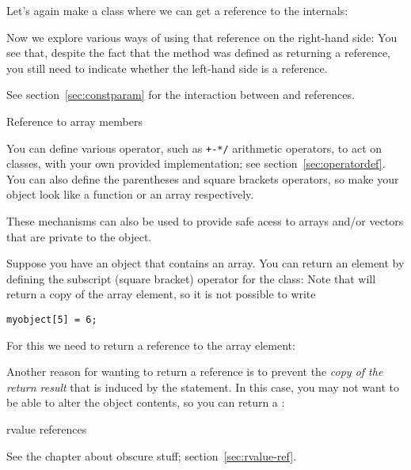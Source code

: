 Let's again make a class where we can get a reference to the
internals:
%

Now we explore various ways of using that reference on the right-hand
side:
%
%
You see that, despite the fact that the method  was defined as
returning a reference, you still need to indicate whether the
left-hand side is a reference.

See section~\ref{sec:constparam} for the interaction between 
and references.

 {Reference to array members}
\label{sec:overloadbracket}

You can define various operator, such as \verb.+-*/. arithmetic
operators, to act on classes, with your own provided implementation;
see section~\ref{sec:operatordef}. You can also define the parentheses
and square brackets operators, so make your object look like a
function or an array respectively.

These mechanisms can also be used to provide safe acess to arrays
and/or vectors that are private to the object.

Suppose you have an object that contains an  array. You can
return an element by defining the subscript (square bracket) operator
for the class:
%
%
Note that  will return a copy of the array element,
so it is not possible to write
\begin{verbatim}
myobject[5] = 6;
\end{verbatim}
For this we need to return a reference to the array element:
%

Another reason for wanting to return a reference is to prevent the
\emph{copy of the return result}
that is induced by the  statement.
In this case, you may not want to be able to alter the object
contents, so you can return a :
%

 {rvalue references}

See the chapter about obscure stuff; section~\ref{sec:rvalue-ref}.

